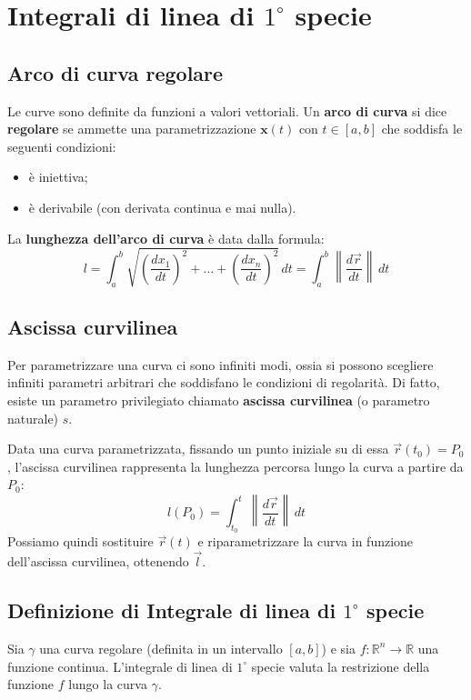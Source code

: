 \chapter{Integrali di linea di $1^\circ$ specie}

\section{Arco di curva regolare}
Le curve sono definite da funzioni a valori vettoriali. Un \textbf{arco di curva} si dice \textbf{regolare} se ammette una parametrizzazione $\mathbf{x}(t)$ con $t \in [a,b]$ che soddisfa le seguenti condizioni:
\begin{itemize}
    \item è iniettiva;
    \item è derivabile (con derivata continua e mai nulla).
\end{itemize}

La \textbf{lunghezza dell'arco di curva} è data dalla formula:
\[
l = \int_{a}^{b} \sqrt{\left(\frac{dx_1}{dt}\right)^2 + \dots + \left(\frac{dx_n}{dt}\right)^2} \, dt = \int_{a}^{b} \left\| \frac{d\vec{r}}{dt} \right\| \, dt
\]

\section{Ascissa curvilinea}
Per parametrizzare una curva ci sono infiniti modi, ossia si possono scegliere infiniti parametri arbitrari che soddisfano le condizioni di regolarità. Di fatto, esiste un parametro privilegiato chiamato \textbf{ascissa curvilinea} (o parametro naturale) $s$.

Data una curva parametrizzata, fissando un punto iniziale su di essa $\vec{r}(t_0)=P_0$, l'ascissa curvilinea rappresenta la lunghezza percorsa lungo la curva a partire da $P_0$:
\[
l(P_0) = \int_{t_0}^{t} \left\| \frac{d\vec{r}}{dt} \right\| \, dt
\]
Possiamo quindi sostituire $\vec{r}(t)$ e riparametrizzare la curva in funzione dell'ascissa curvilinea, ottenendo $\vec{l}$.

\section{Definizione di Integrale di linea di $1^\circ$ specie}
Sia $\gamma$ una curva regolare (definita in un intervallo $[a,b]$) e sia $f: \mathbb{R}^n \rightarrow \mathbb{R}$ una funzione continua. 
L'integrale di linea di $1^\circ$ specie valuta la restrizione della funzione $f$ lungo la curva $\gamma$.

